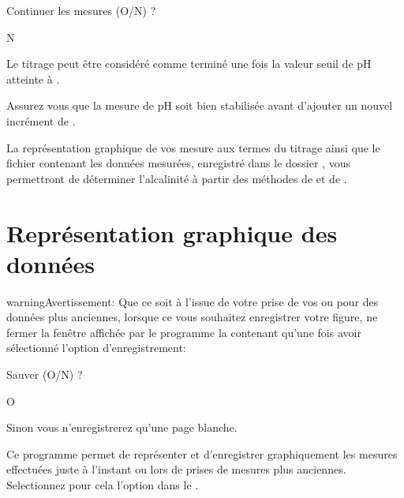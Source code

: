 \documentclass[letterpaper,10pt,french]{sphinxmanual}
\begin{document}
\begin{sphinxVerbatim}[commandchars=\\\{\}]
Continuer les mesures (O/N) ?

\PYGZhy{}\PYGZgt{} N
\end{sphinxVerbatim}

\sphinxAtStartPar
Le titrage peut être considéré comme terminé une fois la valeur seuil de pH atteinte à .

\sphinxAtStartPar
Assurez vous que la mesure de pH soit bien stabilisée avant d’ajouter un nouvel incrément de .

\sphinxAtStartPar
La représentation graphique de vos mesure aux termes du titrage ainsi que le fichier contenant les données
mesurées, enregistré dans le dossier , vous permettront de déterminer l’alcalinité à partir des méthodes de
 et de .

\sphinxstepscope


\chapter{Représentation graphique des données}
\label{\detokenize{graph:representation-graphique-des-donnees}}\label{\detokenize{graph:graph}}\label{\detokenize{graph::doc}}
\begin{sphinxadmonition}{warning}{Avertissement:}
\sphinxAtStartPar
Que ce soit à l’issue de votre prise de vos {\hyperref[\detokenize{mesure:mesure}]{}} ou pour des données plus anciennes,
lorsque ce vous souhaitez enregistrer votre figure, ne fermer la fenêtre affichée par le programme la contenant qu’une fois avoir sélectionné
l’option d’enregistrement:

\begin{sphinxVerbatim}[commandchars=\\\{\}]
Sauver (O/N) ?

\PYGZhy{}\PYGZgt{} O
\end{sphinxVerbatim}

\sphinxAtStartPar
Sinon vous n’enregistrerez qu’une page blanche.
\end{sphinxadmonition}

\sphinxAtStartPar
Ce programme permet de représenter et d’enregistrer graphiquement les mesures
effectuées juste à l’instant ou lors de prises de mesures plus anciennes.
Selectionnez pour cela l’option  dans le .
\end{document}
